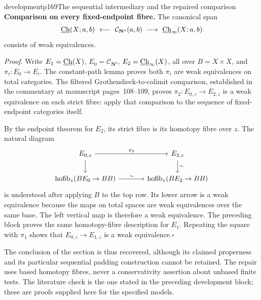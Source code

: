 \begin{dcomment}{development}{p169}{The sequential intermediary and the repaired comparison}
\textbf{Comparison on every fixed-endpoint fibre.}\ours\quad
The canonical span
\[
 \underline{\mathrm{Ch}}(X;a,b)\ \longleftarrow\
 \mathcal C_{\mathbf N^o}(a,b)\ \longrightarrow\
 \underline{\mathrm{Ch}}_\infty(X;a,b)
\]
consists of weak equivalences.

\emph{Proof.} Write $E_1=\underline{\mathrm{Ch}}(X)$, $E_0=\mathcal C_{\mathbf N^o}$, $E_2=\underline{\mathrm{Ch}}_\infty(X)$, all over $B=X\times X$, and $\pi_i:E_0\to E_i$. The constant-path lemma proves both $\pi_i$ are weak equivalences on total categories. The filtered Grothendieck-to-colimit comparison, established in the commentary at manuscript pages~108--109, proves $\pi_2:E_{0,z}\to E_{2,z}$ is a weak equivalence on each strict fibre: apply that comparison to the sequence of fixed-endpoint categories itself.

By the endpoint theorem for $E_2$, its strict fibre is its homotopy fibre over $z$. The natural diagram
\[
\begin{tikzcd}[column sep=large]
 E_{0,z}\arrow[r,"\pi_2"]\arrow[d] & E_{2,z}\arrow[d,"\sim"]\\
 \operatorname{hofib}_z(BE_0\to BB)\arrow[r,"\sim"] &
 \operatorname{hofib}_z(BE_2\to BB)
\end{tikzcd}
\]
is understood after applying $B$ to the top row. Its lower arrow is a weak equivalence because the maps on total spaces are weak equivalences over the same base. The left vertical map is therefore a weak equivalence. The preceding block proves the same homotopy-fibre description for $E_1$. Repeating the square with $\pi_1$ shows that $E_{0,z}\to E_{1,z}$ is a weak equivalence.\hfill$\square$

The conclusion of the section is thus recovered, although its claimed properness and its particular sequential padding construction cannot be retained. The repair uses based homotopy fibres, never a conservativity assertion about unbased finite tests. The literature check is the one stated in the preceding development block; these are proofs supplied here for the specified models.
\end{dcomment}



